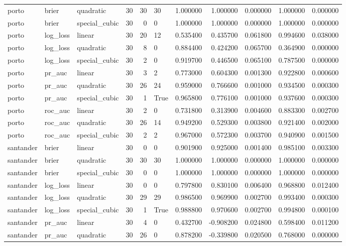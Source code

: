 \begin{longtable}{lllrrlrrrrr}
porto & brier & quadratic & 30 & 30 & 30 & 1.000000 & 1.000000 & 0.000000 & 1.000000 & 0.000000 \\
porto & brier & special\_cubic & 30 & 0 & 0 & 1.000000 & 1.000000 & 0.000000 & 1.000000 & 0.000000 \\
porto & log\_loss & linear & 30 & 20 & 12 & 0.535400 & 0.435700 & 0.061800 & 0.994600 & 0.038000 \\
porto & log\_loss & quadratic & 30 & 8 & 0 & 0.884400 & 0.424200 & 0.065700 & 0.364900 & 0.000000 \\
porto & log\_loss & special\_cubic & 30 & 2 & 0 & 0.919700 & 0.446500 & 0.065100 & 0.787500 & 0.000000 \\
porto & pr\_auc & linear & 30 & 3 & 2 & 0.773000 & 0.604300 & 0.001300 & 0.922800 & 0.000600 \\
porto & pr\_auc & quadratic & 30 & 26 & 24 & 0.959000 & 0.766600 & 0.001000 & 0.934500 & 0.000300 \\
porto & pr\_auc & special\_cubic & 30 & 1 & True & 0.965800 & 0.776100 & 0.001000 & 0.937600 & 0.000300 \\
porto & roc\_auc & linear & 30 & 2 & 0 & 0.731800 & 0.313900 & 0.004600 & 0.883300 & 0.002700 \\
porto & roc\_auc & quadratic & 30 & 26 & 14 & 0.949200 & 0.529300 & 0.003800 & 0.921400 & 0.002000 \\
porto & roc\_auc & special\_cubic & 30 & 2 & 2 & 0.967000 & 0.572300 & 0.003700 & 0.940900 & 0.001500 \\
santander & brier & linear & 30 & 0 & 0 & 0.901900 & 0.925000 & 0.001400 & 0.985100 & 0.003300 \\
santander & brier & quadratic & 30 & 30 & 30 & 1.000000 & 1.000000 & 0.000000 & 1.000000 & 0.000000 \\
santander & brier & special\_cubic & 30 & 0 & 0 & 1.000000 & 1.000000 & 0.000000 & 1.000000 & 0.000000 \\
santander & log\_loss & linear & 30 & 0 & 0 & 0.797800 & 0.830100 & 0.006400 & 0.968800 & 0.012400 \\
santander & log\_loss & quadratic & 30 & 29 & 29 & 0.986500 & 0.969900 & 0.002700 & 0.993400 & 0.000300 \\
santander & log\_loss & special\_cubic & 30 & 1 & True & 0.988800 & 0.970600 & 0.002700 & 0.994800 & 0.000100 \\
santander & pr\_auc & linear & 30 & 4 & 0 & 0.432700 & -0.908200 & 0.024800 & 0.598400 & 0.011200 \\
santander & pr\_auc & quadratic & 30 & 26 & 0 & 0.878200 & -0.339800 & 0.020500 & 0.768000 & 0.000000 \\

\end{longtable}
